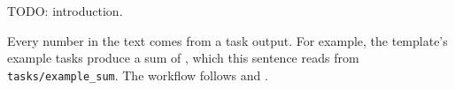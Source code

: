 TODO: introduction.

Every number in the text comes from a task output.
For example, the template's example tasks produce a sum of \exampleSum{}, which this sentence reads from \texttt{tasks/example\_sum}.
The workflow follows \citet{GentzkowShapiro:2014} and \citet{Dingel:projecttemplate}.
